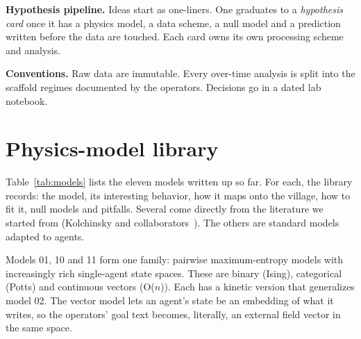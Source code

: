 \documentclass[reprint,aps,pre,10pt,superscriptaddress,nofootinbib]{revtex4-2}
\begin{document}
\textbf{Hypothesis pipeline.} Ideas start as one-liners. One graduates to a \emph{hypothesis card} once it has a physics model, a data scheme, a null model and a prediction written before the data are touched. Each card owns its own processing scheme and analysis.

\textbf{Conventions.} Raw data are immutable. Every over-time analysis is split into the scaffold regimes documented by the operators. Decisions go in a dated lab notebook.

\section{Physics-model library}\label{sec:models}

Table~\ref{tab:models} lists the eleven models written up so far. For each, the library records: the model, its interesting behavior, how it maps onto the village, how to fit it, null models and pitfalls. Several come directly from the literature we started from (Kolchinsky and collaborators~\cite{kolchinsky2018,sowinski2023,kolchinsky2024,pinero2025,pinero2026,aguilera2026,bartlett2025}). The others are standard models adapted to agents.

Models 01, 10 and 11 form one family: pairwise maximum-entropy models with increasingly rich single-agent state spaces. These are binary (Ising), categorical (Potts) and continuous vectors (O($n$)). Each has a kinetic version that generalizes model 02. The vector model lets an agent's state be an embedding of what it writes, so the operators' goal text becomes, literally, an external field vector in the same space.
\end{document}
